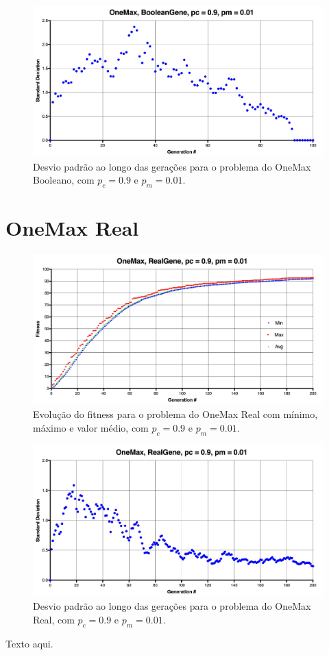 \begin{figure}[ht!]
    \centering \includegraphics[width=1.0\textwidth]{onemax_boolean_std.jpg}
    \caption{Desvio padrão ao longo das gerações para o problema do OneMax Booleano, com $p_c=0.9$ e $p_m=0.01$.}
    \label{fig:onemax_boolean}
\end{figure}

\section{OneMax Real}

\begin{figure}[ht!]
    \centering \includegraphics[width=1.0\textwidth]{onemax_real.jpg}
    \caption{Evolução do fitness para o problema do OneMax Real com mínimo, máximo e valor médio, com $p_c=0.9$ e $p_m=0.01$.}
    \label{fig:onemax_boolean}
\end{figure}

\begin{figure}[ht!]
    \centering \includegraphics[width=1.0\textwidth]{onemax_real_std.jpg}
    \caption{Desvio padrão ao longo das gerações para o problema do OneMax Real, com $p_c=0.9$ e $p_m=0.01$.}
    \label{fig:onemax_boolean}
\end{figure}

Texto aqui.